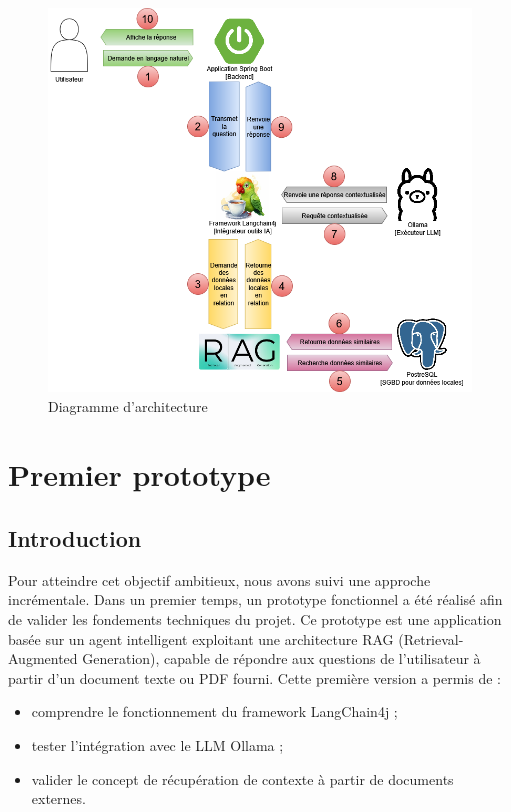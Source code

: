\documentclass[12pt,a4paper]{report}
\begin{document}
	\begin{figure}[H]
		\centering
		\includegraphics[width=1\textwidth]{illustration-graphique.drawio.png}
		\caption{Diagramme d'architecture}
		\label{fig:illustration-graphique}
	\end{figure}
	
	
	
	\section{Premier prototype}
	
	\subsection{Introduction}
	
	Pour atteindre cet objectif ambitieux, nous avons suivi une approche incrémentale. Dans un premier temps, un prototype fonctionnel a été réalisé afin de valider les fondements techniques du projet. Ce prototype est une application basée sur un agent intelligent exploitant une architecture RAG (Retrieval-Augmented Generation), capable de répondre aux questions de l’utilisateur à partir d’un document texte ou PDF fourni. Cette première version a permis de :
	\begin{itemize}
		\item comprendre le fonctionnement du framework LangChain4j ;
		\item tester l’intégration avec le LLM Ollama ;
		\item valider le concept de récupération de contexte à partir de documents externes.
	\end{itemize}
	
\end{document}
